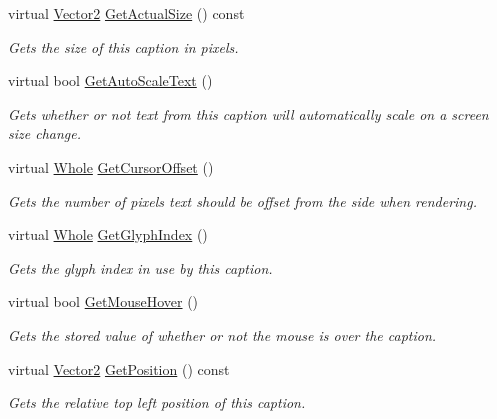 \begin{DoxyCompactItemize}
virtual \hyperlink{classMezzanine_1_1Vector2}{Vector2} \hyperlink{classMezzanine_1_1UI_1_1Caption_a4b64d9dea1b059fd136ea234b8044a9b}{GetActualSize} () const 
\begin{DoxyCompactList}\small\item\em Gets the size of this caption in pixels. \item\end{DoxyCompactList}\item 
virtual bool \hyperlink{classMezzanine_1_1UI_1_1Caption_a2b83af8d15b35ba37661157cc376910d}{GetAutoScaleText} ()
\begin{DoxyCompactList}\small\item\em Gets whether or not text from this caption will automatically scale on a screen size change. \item\end{DoxyCompactList}\item 
virtual \hyperlink{namespaceMezzanine_adcbb6ce6d1eb4379d109e51171e2e493}{Whole} \hyperlink{classMezzanine_1_1UI_1_1Caption_a93da9adffc448e61d7fea14ab84c5421}{GetCursorOffset} ()
\begin{DoxyCompactList}\small\item\em Gets the number of pixels text should be offset from the side when rendering. \item\end{DoxyCompactList}\item 
virtual \hyperlink{namespaceMezzanine_adcbb6ce6d1eb4379d109e51171e2e493}{Whole} \hyperlink{classMezzanine_1_1UI_1_1Caption_a70275e20608116cce923106d3924781a}{GetGlyphIndex} ()
\begin{DoxyCompactList}\small\item\em Gets the glyph index in use by this caption. \item\end{DoxyCompactList}\item 
virtual bool \hyperlink{classMezzanine_1_1UI_1_1Caption_ac4dface89d5105741e38facd6efe7aed}{GetMouseHover} ()
\begin{DoxyCompactList}\small\item\em Gets the stored value of whether or not the mouse is over the caption. \item\end{DoxyCompactList}\item 
virtual \hyperlink{classMezzanine_1_1Vector2}{Vector2} \hyperlink{classMezzanine_1_1UI_1_1Caption_a232f175144378d1d8c0e2966dbcc4371}{GetPosition} () const 
\begin{DoxyCompactList}\small\item\em Gets the relative top left position of this caption. \item\end{DoxyCompactList}\item 

\end{DoxyCompactItemize}
